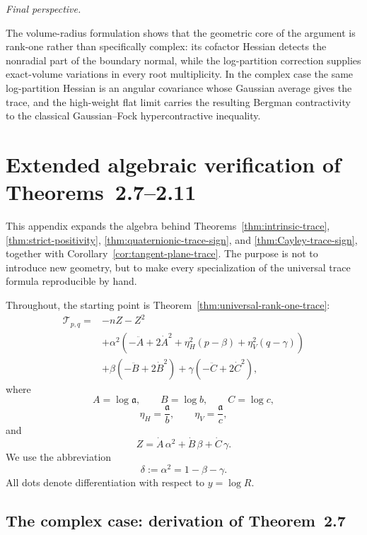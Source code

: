 \documentclass[11pt,reqno]{amsart}
\numberwithin{equation}{section}
\theoremstyle{definition}
\theoremstyle{remark}
\newcommand{\ithead}[1]{%
  \par\medskip\noindent\textit{#1}\enspace
}
\begin{document}
\ithead{Final perspective.}
The volume-radius formulation shows that the geometric core of the argument
is rank-one rather than specifically complex: its cofactor Hessian detects
the nonradial part of the boundary normal, while the log-partition correction
supplies exact-volume variations in every root multiplicity.  In the complex
case the same log-partition Hessian is an angular covariance whose Gaussian
average gives the trace, and the high-weight flat limit carries the resulting
Bergman contractivity to the classical Gaussian--Fock hypercontractive
inequality.



\appendix
\section{Extended algebraic verification of Theorems~2.7--2.11}
\label{app:extended-trace-verification}

This appendix expands the algebra behind Theorems~\ref{thm:intrinsic-trace},
\ref{thm:strict-positivity}, \ref{thm:quaternionic-trace-sign}, and
\ref{thm:Cayley-trace-sign}, together with Corollary~\ref{cor:tangent-plane-trace}.
The purpose is not to introduce new geometry, but to make every specialization
of the universal trace formula reproducible by hand.

Throughout, the starting point is Theorem~\ref{thm:universal-rank-one-trace}:
\begin{equation}
\begin{aligned}
\mathscr T_{p,q}
={}&-nZ-Z^2\\
&+\alpha^2\left(
-\ddot A+2\dot A^2
+\eta_H^2(p-\beta)
+\eta_V^2(q-\gamma)
\right)\\
&+\beta(-\ddot B+2\dot B^2)
+\gamma(-\ddot C+2\dot C^2),
\end{aligned}
\label{eq:appx-universal-trace}
\end{equation}
where
\[
A=\log\mathfrak a,\qquad B=\log b,\qquad C=\log c,
\]
\[
\eta_H=\frac{\mathfrak a}{b},\qquad
\eta_V=\frac{\mathfrak a}{c},
\]
and
\[
Z=\dot A\,\alpha^2+\dot B\,\beta+\dot C\,\gamma.
\]
We use the abbreviation
\begin{equation}
\delta:=\alpha^2=1-\beta-\gamma.
\label{eq:appx-delta}
\end{equation}
All dots denote differentiation with respect to $y=\log R$.

\subsection{The complex case: derivation of Theorem~2.7}
\end{document}
